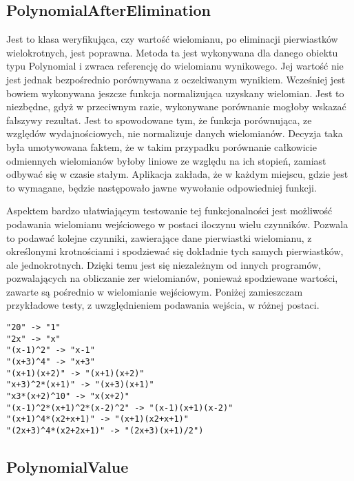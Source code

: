 \subsection{PolynomialAfterElimination}

Jest to klasa weryfikująca, czy wartość wielomianu, po eliminacji pierwiastków wielokrotnych, jest poprawna. Metoda ta jest wykonywana dla danego obiektu typu Polynomial i zwraca referencję do wielomianu wynikowego. Jej wartość nie jest jednak bezpośrednio porównywana z oczekiwanym wynikiem. Wcześniej jest bowiem wykonywana jeszcze funkcja normalizująca uzyskany wielomian. Jest to niezbędne, gdyż w przeciwnym razie, wykonywane porównanie mogłoby wskazać fałszywy rezultat. Jest to spowodowane tym, że funkcja porównująca, ze względów wydajnościowych, nie normalizuje danych wielomianów. Decyzja taka była umotywowana faktem, że w takim przypadku porównanie całkowicie odmiennych wielomianów byłoby liniowe ze względu na ich stopień, zamiast odbywać się w czasie stałym. Aplikacja zakłada, że w każdym miejscu, gdzie jest to wymagane, będzie następowało jawne wywołanie odpowiedniej funkcji.

Aspektem bardzo ułatwiającym testowanie tej funkcjonalności jest możliwość podawania wielomianu wejściowego w postaci iloczynu wielu czynników. Pozwala to podawać kolejne czynniki, zawierające dane pierwiastki wielomianu, z określonymi krotnościami i spodziewać się dokładnie tych samych pierwiastków, ale jednokrotnych. Dzięki temu jest się niezależnym od innych programów, pozwalających na obliczanie zer wielomianów, ponieważ spodziewane wartości, zawarte są pośrednio w wielomianie wejściowym. Poniżej zamieszczam przykładowe testy, z uwzględnieniem podawania wejścia, w różnej postaci.

\begin{lstlisting}
"20" -> "1"
"2x" -> "x"
"(x-1)^2" -> "x-1"
"(x+3)^4" -> "x+3"
"(x+1)(x+2)" -> "(x+1)(x+2)"
"x+3)^2*(x+1)" -> "(x+3)(x+1)"
"x3*(x+2)^10" -> "x(x+2)"
"(x-1)^2*(x+1)^2*(x-2)^2" -> "(x-1)(x+1)(x-2)"
"(x+1)^4*(x2+x+1)" -> "(x+1)(x2+x+1)"
"(2x+3)^4*(x2+2x+1)" -> "(2x+3)(x+1)/2")
\end{lstlisting}

\subsection{PolynomialValue}

